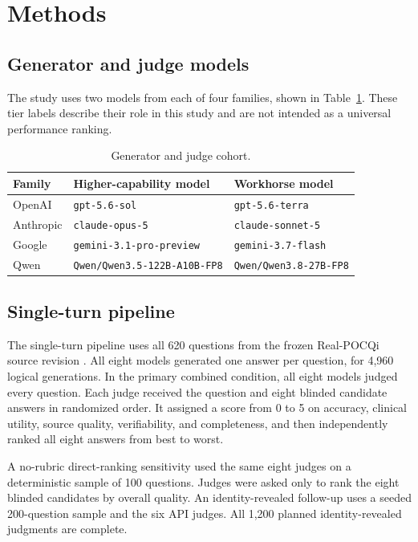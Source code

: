 \documentclass[11pt]{article}
\newcommand{\model}[1]{\texttt{#1}}
\begin{document}
\section{Methods}

\subsection{Generator and judge models}

The study uses two models from each of four families, shown in
Table~\ref{tab:cohort}. These tier labels describe their role in this study and
are not intended as a universal performance ranking.

\begin{table}[htbp]
\centering
\caption{Generator and judge cohort.}
\label{tab:cohort}
\begin{tabular}{lll}
\toprule
Family & Higher-capability model & Workhorse model \\
\midrule
OpenAI & \model{gpt-5.6-sol} & \model{gpt-5.6-terra} \\
Anthropic & \model{claude-opus-5} & \model{claude-sonnet-5} \\
Google & \model{gemini-3.1-pro-preview} & \model{gemini-3.7-flash} \\
Qwen & \model{Qwen/Qwen3.5-122B-A10B-FP8} & \model{Qwen/Qwen3.8-27B-FP8} \\
\bottomrule
\end{tabular}
\end{table}
\FloatBarrier

\subsection{Single-turn pipeline}

The single-turn pipeline uses all 620 questions from the frozen
Real-POCQi source revision \cite{feng2026}. All eight models generated one answer per question,
for 4,960 logical generations. In the primary combined condition, all eight
models judged every question. Each judge received the question and eight
blinded candidate answers in randomized order. It assigned a score from 0 to 5
on accuracy, clinical utility, source quality, verifiability, and completeness,
and then independently ranked all eight answers from best to worst.

A no-rubric direct-ranking sensitivity used the same eight judges on a
deterministic sample of 100 questions. Judges were asked only to rank the eight
blinded candidates by overall quality. An identity-revealed follow-up uses a
seeded 200-question sample and the six API judges. All 1,200 planned
identity-revealed judgments are complete.
\end{document}
